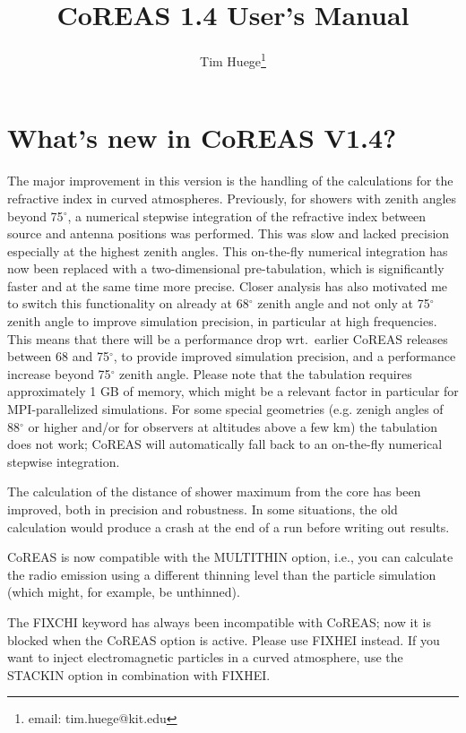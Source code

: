 \documentclass[a4paper,10pt]{article}
\title{CoREAS 1.4 User's Manual}
\author{Tim Huege\footnote{email: tim.huege@kit.edu}}
\begin{document}
\maketitle

\section{What's new in CoREAS V1.4?}

The major improvement in this version is the handling of the calculations for the refractive index in curved atmospheres. Previously, for showers with zenith angles beyond 75$^\circ$, a numerical stepwise integration of the refractive index between source and antenna positions was performed. This was slow and lacked precision especially at the highest zenith angles. This on-the-fly numerical integration has now been replaced with a two-dimensional pre-tabulation, which is significantly faster and at the same time more precise. Closer analysis has also motivated me to switch this functionality on already at 68$^\circ$ zenith angle and not only at 75$^\circ$ zenith angle to improve simulation precision, in particular at high frequencies. This means that there will be a performance drop wrt.\ earlier CoREAS releases between 68 and 75$^\circ$, to provide improved simulation precision, and a performance increase beyond 75$^\circ$ zenith angle. Please note that the tabulation requires approximately 1 GB of memory, which might be a relevant factor in particular for MPI-parallelized simulations. For some special geometries (e.g. zenigh angles of 88$^\circ$ or higher and/or for observers at altitudes above a few km) the tabulation does not work; CoREAS will automatically fall back to an on-the-fly numerical stepwise integration.

The calculation of the distance of shower maximum from the core has been improved, both in precision and robustness. In some situations, the old calculation would produce a crash at the end of a run before writing out results.

CoREAS is now compatible with the MULTITHIN option, i.e., you can calculate the radio emission using a different thinning level than the particle simulation (which might, for example, be unthinned).

The FIXCHI keyword has always been incompatible with CoREAS; now it is blocked when the CoREAS option is active. Please use FIXHEI instead. If you want to inject electromagnetic particles in a curved atmosphere, use the STACKIN option in combination with FIXHEI.
\end{document}

